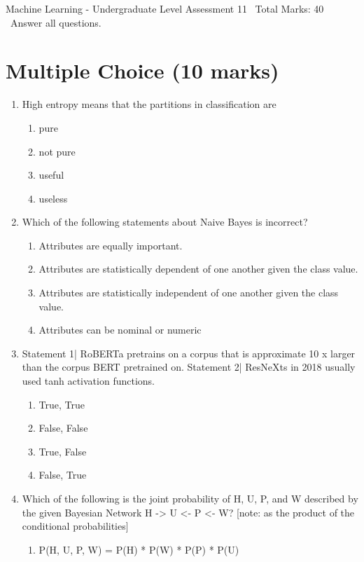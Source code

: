 \documentclass[12pt]{article}
\begin{document}
\begin{center}
Machine Learning - Undergraduate Level Assessment 11 \
Total Marks: 40 \
Answer all questions.
\end{center}

\section*{Multiple Choice (10 marks)}
\begin{enumerate}[label=\arabic*.]
\item High entropy means that the partitions in classification are
\begin{enumerate}[label=(\alph*)]
    \item pure
    \item not pure
    \item useful
    \item useless
\end{enumerate}
\item Which of the following statements about Naive Bayes is incorrect?
\begin{enumerate}[label=(\alph*)]
    \item Attributes are equally important.
    \item Attributes are statistically dependent of one another given the class value.
    \item Attributes are statistically independent of one another given the class value.
    \item Attributes can be nominal or numeric
\end{enumerate}
\item Statement 1| RoBERTa pretrains on a corpus that is approximate 10 x larger than the corpus BERT pretrained on. Statement 2| ResNeXts in 2018 usually used tanh activation functions.
\begin{enumerate}[label=(\alph*)]
    \item True, True
    \item False, False
    \item True, False
    \item False, True
\end{enumerate}
\item Which of the following is the joint probability of H, U, P, and W described by the given Bayesian Network H -\textgreater{} U \textless{}- P \textless{}- W? [note: as the product of the conditional probabilities]
\begin{enumerate}[label=(\alph*)]
    \item P(H, U, P, W) = P(H) * P(W) * P(P) * P(U)

\end{enumerate}
\end{enumerate}
\end{document}
